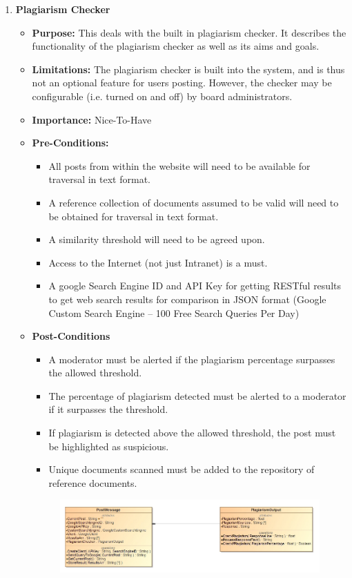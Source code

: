\documentclass[11pt]{article}
\begin{document}
\begin{enumerate}
\item \textbf{Plagiarism Checker}
\graphicspath{ {../Diagrams/Tienie/Plagiarism/}}
	\begin{itemize}
		\item \textbf{Purpose: }
			This deals with the built in plagiarism checker. It describes the functionality of the plagiarism checker as well as its aims and goals.
		\item \textbf{Limitations:} 
		The plagiarism checker is built into the system, and is thus not an optional feature for users posting. However, the checker may be configurable (i.e. turned on and off) by board administrators.
		\item 	\textbf{Importance: }Nice-To-Have
		\item 	\textbf{Pre-Conditions: }
			\begin{itemize}
	  			\item All posts from within the website will need to be available for traversal in text format.
	  			\item A reference collection of documents assumed to be valid will need to be obtained for traversal in text format.
	  			\item A similarity threshold will need to be agreed upon.
		 		\item Access to the Internet (not just Intranet) is a must.
		  		\item A google Search Engine ID and API Key for getting RESTful results to get web search results for comparison in JSON format (Google Custom Search Engine – 100 Free Search Queries Per Day)
		  	\end{itemize}
		\item	\textbf{Post-Conditions}
		  	\begin{itemize}
	  			\item A moderator must be alerted if the plagiarism percentage surpasses the allowed threshold.
		  		\item The percentage of plagiarism detected must be alerted to a moderator if it surpasses the threshold.
	 			\item If plagiarism is detected above the allowed threshold, the post must be highlighted as suspicious.
		  		\item Unique documents scanned must be added to the repository of reference documents.
		  	\end{itemize}
		  	\newpage
	  			\begin{figure}[H]
	  				\includegraphics[scale=0.5]{InputOutput.jpg}

\end{figure}
\end{itemize}
\end{enumerate}
\end{document}
